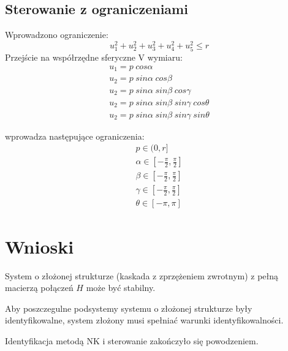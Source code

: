 \documentclass{article}
\begin{document}
\subsection{Sterowanie z ograniczeniami}
Wprowadzono ograniczenie:
\begin{equation}
u_1^2+u_2^2+u_3^2+u_4^2+u_5^2 \leqslant r
\end{equation}
Przejście na współrzędne sferyczne V wymiaru:
\begin{equation}
\begin{matrix}
u_1 = p \hspace{3pt} cos{\alpha} \\
u_2 = p \hspace{3pt} sin{\alpha} \hspace{3pt} cos{\beta} \\
u_2 = p \hspace{3pt} sin{\alpha} \hspace{3pt} sin{\beta} \hspace{3pt} cos{\gamma} \\
u_2 = p \hspace{3pt} sin{\alpha} \hspace{3pt} sin{\beta} \hspace{3pt} sin{\gamma} \hspace{3pt} cos{\theta} \\
u_2 = p \hspace{3pt} sin{\alpha} \hspace{3pt} sin{\beta} \hspace{3pt} sin{\gamma} \hspace{3pt} sin{\theta}
\end{matrix}
\end{equation}

wprowadza następujące ograniczenia:
\begin{equation}
\begin{matrix}
p \in (0, r] \\
\alpha \in [-\frac{\pi}{2}, \frac{\pi}{2}] \\
\beta \in [-\frac{\pi}{2}, \frac{\pi}{2}] \\
\gamma \in [-\frac{\pi}{2}, \frac{\pi}{2}] \\
\theta \in [-\pi, \pi] 
\end{matrix}
\end{equation}

\section{Wnioski}
System o złożonej strukturze (kaskada z zprzężeniem zwrotnym) z pełną macierzą połączeń \(H\) może być stabilny. 
\par
Aby poszczegulne podsystemy systemu o złożonej strukturze były identyfikowalne, system złożony musi spełniać warunki identyfikowalności.
\par 
Identyfikacja metodą NK i sterowanie zakończyło się powodzeniem.
\end{document}
